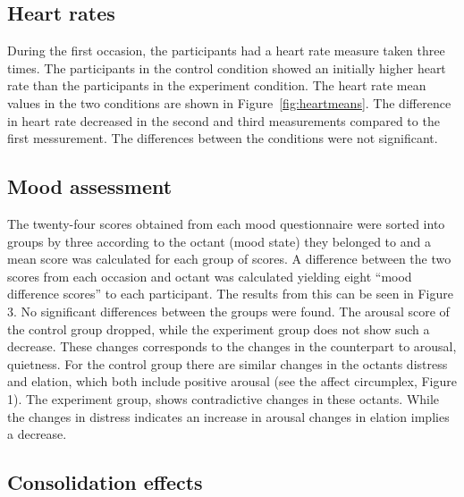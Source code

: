 \documentclass[jou,draftfirst,11pt]{apa6}
\begin{document}
\subsection{Heart rates}

During the first occasion, the participants had a heart rate measure
taken three times. The participants in the control condition showed an
initially higher heart rate than the participants in the experiment
condition. The heart rate mean values in the two conditions are shown
in Figure~\ref{fig:heartmeans}.  The difference in heart rate
decreased in the second and third measurements compared to the first
messurement.  The differences between the conditions were not
significant.





\subsection{Mood assessment}

The twenty-four scores obtained from each mood questionnaire  were
sorted into groups by three according to the octant (mood state) they
belonged to and a mean score was calculated for each group of scores.
A difference between the two scores from each occasion and octant was
calculated yielding eight ``mood difference scores'' to each
participant.  The results from this can be seen in Figure 3.  No
significant differences between the groups were found.  The arousal
score of the control group dropped, while the experiment group does
not show such a decrease. These changes corresponds to the changes in
the counterpart to arousal, quietness.  For the control group there
are similar changes in the octants distress and elation, which both
include positive arousal (see the affect circumplex, Figure 1). The
experiment group, shows contradictive changes in these octants. While
the changes in distress indicates an increase in arousal changes in
elation implies a decrease.




\subsection{Consolidation effects}




\end{document}
